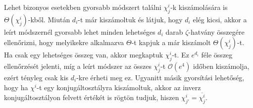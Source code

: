 Lehet bizonyos esetekben gyorsabb módszert találni $\chi^i_j$-k kiszámolására is $\Theta(\chi^i_j)$-kből.
Miután $d_i$-t már kiszámoltuk és látjuk, hogy $d_i$ elég kicsi, akkor a leírt módszernél gyorsabb lehet minden lehetséges $d_i$ darab $\zeta$-hatvány összegére ellenőrizni,
hogy melyikekre alkalmazva $\Theta$-t kapjuk a már kiszámolt $\Theta(\chi^i_j)$-t.
Ha csak egy lehetséges összeg van, akkor megkaptuk $\chi^i_j$-t.
Ez $e^{d_i}$ féle összeg ellenőrzését jelenti, míg a leírt módszer az összes $\chi^i_j$-t $\mathcal{O}(e^4)$ időben kiszámolja, ezért tényleg csak kis $d_i$-kre érheti meg ez.
Ugyanitt másik gyorsítási lehetőség, hogy ha $\chi^i$-t egy konjugáltosztályra kiszámoltuk, akkor az inverz konjugáltosztályon felvett értékét is rögtön tudjuk, hiszen $\chi^i_{j'}=\overline{\chi^i_j}$.
